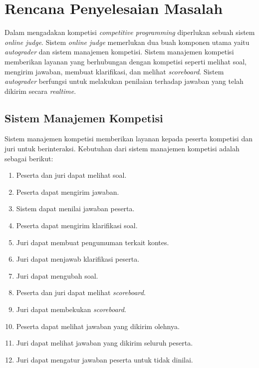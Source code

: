 \chapter{Rencana Penyelesaian Masalah}

\par Dalam mengadakan kompetisi \textit{competitive programming} diperlukan sebuah sistem \textit{online judge}. Sistem \textit{online judge} memerlukan dua buah komponen utama yaitu \textit{autograder} dan sistem manajemen kompetisi. Sistem manajemen kompetisi memberikan layanan yang berhubungan dengan kompetisi seperti melihat soal, mengirim jawaban, membuat klarifikasi, dan melihat \textit{scoreboard}. Sistem \textit{autograder} berfungsi untuk melakukan penilaian terhadap jawaban yang telah dikirim secara \textit{realtime}.

\section{Sistem Manajemen Kompetisi}

\par Sistem manajemen kompetisi memberikan layanan kepada peserta kompetisi dan juri untuk berinteraksi. Kebutuhan dari sistem manajemen kompetisi adalah sebagai berikut:

\begin{enumerate}
    \item Peserta dan juri dapat melihat soal.
    \item Peserta dapat mengirim jawaban.
    \item Sistem dapat menilai jawaban peserta.
    \item Peserta dapat mengirim klarifikasi soal.
    \item Juri dapat membuat pengumuman terkait kontes.
    \item Juri dapat menjawab klarifikasi peserta.
    \item Juri dapat mengubah soal.
    \item Peserta dan juri dapat melihat \textit{scoreboard}.
    \item Juri dapat membekukan \textit{scoreboard}.
    \item Peserta dapat melihat jawaban yang dikirim olehnya.
    \item Juri dapat melihat jawaban yang dikirim seluruh peserta.
    \item Juri dapat mengatur jawaban peserta untuk tidak dinilai.
\end{enumerate}


